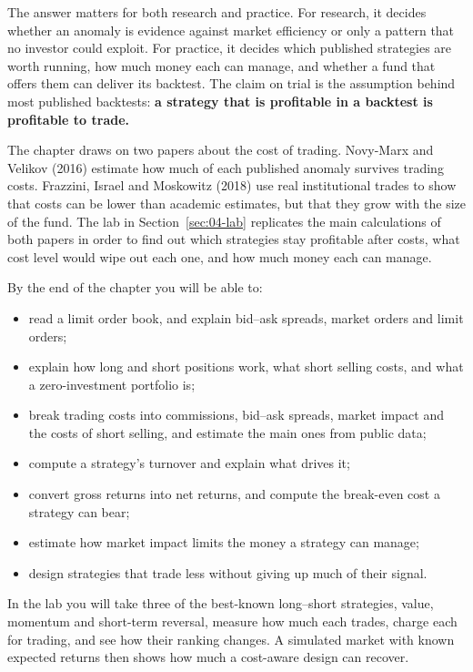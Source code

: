 The answer matters for both research and practice. For research, it decides whether an anomaly is evidence against market efficiency or only a pattern that no investor could exploit. For practice, it decides which published strategies are worth running, how much money each can manage, and whether a fund that offers them can deliver its backtest. The claim on trial is the assumption behind most published backtests: \textbf{a strategy that is profitable in a backtest is profitable to trade.}

The chapter draws on two papers about the cost of trading. Novy-Marx and Velikov (2016) estimate how much of each published anomaly survives trading costs. Frazzini, Israel and Moskowitz (2018) use real institutional trades to show that costs can be lower than academic estimates, but that they grow with the size of the fund. The lab in Section~\ref{sec:04-lab} replicates the main calculations of both papers in order to find out which strategies stay profitable after costs, what cost level would wipe out each one, and how much money each can manage.

By the end of the chapter you will be able to:

\begin{itemize}
  \item read a limit order book, and explain bid--ask spreads, market orders and limit orders;
  \item explain how long and short positions work, what short selling costs, and what a zero-investment portfolio is;
  \item break trading costs into commissions, bid--ask spreads, market impact and the costs of short selling, and estimate the main ones from public data;
  \item compute a strategy's turnover and explain what drives it;
  \item convert gross returns into net returns, and compute the break-even cost a strategy can bear;
  \item estimate how market impact limits the money a strategy can manage;
  \item design strategies that trade less without giving up much of their signal.
\end{itemize}

In the lab you will take three of the best-known long--short strategies, value, momentum and short-term reversal, measure how much each trades, charge each for trading, and see how their ranking changes. A simulated market with known expected returns then shows how much a cost-aware design can recover.

